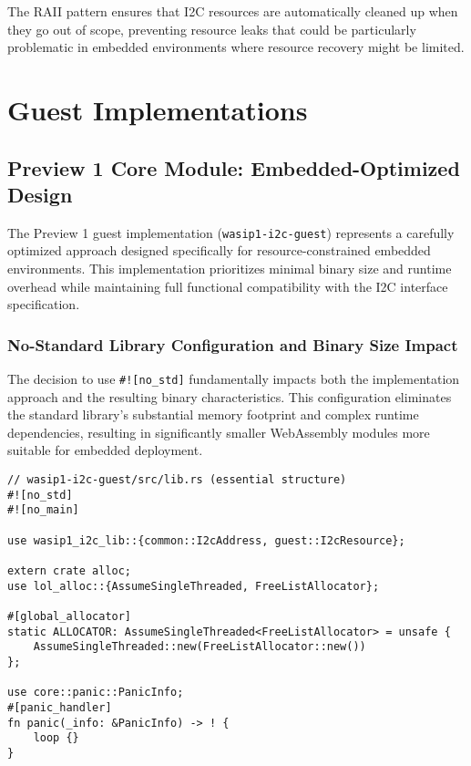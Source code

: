 The RAII pattern ensures that I2C resources are automatically cleaned up when they go out of scope, preventing resource leaks that could be particularly problematic in embedded environments where resource recovery might be limited.

\section{Guest Implementations}
\label{sec:guest-implementations}

\subsection{Preview 1 Core Module: Embedded-Optimized Design}

The Preview 1 guest implementation (\texttt{wasip1-i2c-guest}) represents a carefully optimized approach designed specifically for resource-constrained embedded environments. This implementation prioritizes minimal binary size and runtime overhead while maintaining full functional compatibility with the I2C interface specification.

\subsubsection{No-Standard Library Configuration and Binary Size Impact}

The decision to use \texttt{\#![no\_std]} fundamentally impacts both the implementation approach and the resulting binary characteristics. This configuration eliminates the standard library's substantial memory footprint and complex runtime dependencies, resulting in significantly smaller WebAssembly modules more suitable for embedded deployment.

\begin{verbatim}
// wasip1-i2c-guest/src/lib.rs (essential structure)
#![no_std]
#![no_main]

use wasip1_i2c_lib::{common::I2cAddress, guest::I2cResource};

extern crate alloc;
use lol_alloc::{AssumeSingleThreaded, FreeListAllocator};

#[global_allocator]
static ALLOCATOR: AssumeSingleThreaded<FreeListAllocator> = unsafe {
    AssumeSingleThreaded::new(FreeListAllocator::new())
};

use core::panic::PanicInfo;
#[panic_handler]
fn panic(_info: &PanicInfo) -> ! {
    loop {}
}
\end{verbatim}

